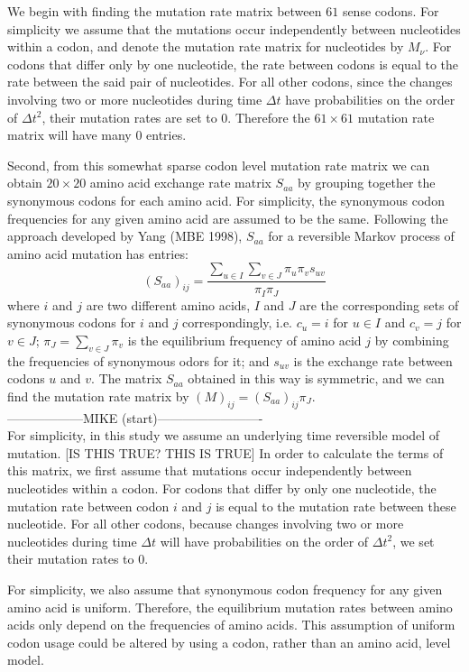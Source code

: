 \documentclass[13pt]{article}
\begin{document}
We begin with finding the mutation rate matrix between $61$ sense codons. 
For simplicity we assume that the mutations occur independently between nucleotides within a codon, and denote the mutation rate matrix for nucleotides by $M_{\nu}$. 
For codons that differ only by one nucleotide, the rate between codons is equal to the rate between the said pair of nucleotides.
For all other codons, since the changes involving two or more nucleotides during time $\Delta t$ have probabilities on the order of $\Delta t^2$, their mutation rates are set to $0$.
Therefore the $61 \times 61$ mutation rate matrix will have many $0$ entries.


Second, from this somewhat sparse codon level mutation rate matrix we can obtain $20 \times 20$ amino acid exchange rate matrix $S_{aa}$ by grouping together the synonymous codons for each amino acid. 
For simplicity, the synonymous codon frequencies for any given amino acid are assumed to be the same. 
Following the approach developed by Yang (MBE 1998), $S_{aa}$ for a reversible Markov process of amino acid mutation has entries:
\[(S_{aa})_{ij} = \frac{\sum_{u \in I} \sum_{v \in J} \pi_u \pi_v s_{uv}}{\pi_I \pi_J}\]
where $i$ and $j$ are two different amino acids, $I$ and $J$ are the corresponding sets of synonymous codons for $i$ and $j$ correspondingly, i.e. $c_u = i$ for $u\in I$ and $c_v = j$ for $v \in J$; $\pi_J = \sum_{v \in J} \pi_v$ is the equilibrium frequency of amino acid $j$ by combining the frequencies of synonymous odors for it; and $s_{uv}$ is the exchange rate between codons $u$ and $v$. 
The matrix $S_{aa}$ obtained in this way is symmetric, and we can find the mutation rate matrix by $(M)_{ij} = (S_{aa})_{ij} \pi_J$.\\

------------------MIKE (start)-------------------------\\
For simplicity, in this study we assume an underlying time reversible model of mutation. [IS THIS TRUE? THIS IS TRUE]
In order to calculate the terms of this matrix, we first assume that mutations occur independently between nucleotides within a codon.
For codons that differ by only one nucleotide, the mutation rate between codon $i$ and $j$ is equal to the mutation rate between these nucleotide.
For all other codons, because changes involving two or more nucleotides during time $\Delta t$ will have probabilities on the order of $\Delta t^2$, we set their mutation rates to 0.

For simplicity, we also assume that synonymous codon frequency for any given amino acid is uniform.
Therefore, the equilibrium mutation rates between amino acids only depend on the frequencies of amino acids.
This assumption of uniform codon usage could be altered by using a codon, rather than an amino acid, level model.
\end{document}
